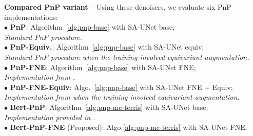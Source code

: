 \documentclass{article}
\begin{document}
\noindent \textbf{Compared PnP variant} -- Using these denoisers, we evaluate six PnP implementations:\\
\hspace*{0.1cm} $\bullet$ \textbf{PnP}: Algorithm~\eqref{alg:pnp-base} with SA-UNet base;\\
\textit{Standard PnP procedure.}\\
\hspace*{0.1cm}$\bullet$ \textbf{PnP-Equiv.}: Algorithm~\eqref{alg:pnp-base} with SA-UNet equiv;\\
\textit{Standard PnP procedure when the training involved equivariant augmentation.}\\
\hspace*{0.1cm}$\bullet$  \textbf{PnP-FNE}: Algorithm~\eqref{alg:pnp-base} with SA-UNet FNE;\\
 \textit{Implementation from \cite{Pesquet2021}.}\\
\hspace*{0.1cm}$\bullet$  \textbf{PnP-FNE-Equiv}: Algo.~\eqref{alg:pnp-base} with SA-UNet FNE + Equiv;\\
\textit{Implementation from \cite{Pesquet2021} when the training involved equivariant augmentation.}\\
$\bullet$  \textbf{Bert-PnP}: Algorithm~\eqref{alg:pnp-mc-terris} with SA-UNet base;\\
\hspace*{0.1cm}  \textit{Implementation provided in \cite{Terris2024}.}\\
\hspace*{0.1cm}$\bullet$   \textbf{Bert-PnP-FNE} (Proposed): Algo.\eqref{alg:pnp-mc-terris} with SA-UNet FNE.\\\vspace{-0.2cm}

\end{document}
